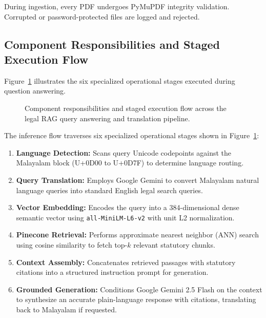 \documentclass[12pt,a4paper]{report}
\begin{document}
During ingestion, every PDF undergoes PyMuPDF integrity validation. Corrupted or password-protected files are logged and rejected.

\subsection{Component Responsibilities and Staged Execution Flow}
Figure~\ref{fig:ml_inference_flow} illustrates the six specialized operational stages executed during question answering.

\begin{figure}[H]
    \centering
    \caption{Component responsibilities and staged execution flow across the legal RAG query answering and translation pipeline.}
    \label{fig:ml_inference_flow}
\end{figure}

The inference flow traverses six specialized operational stages shown in Figure~\ref{fig:ml_inference_flow}:
\begin{enumerate}
    \item \textbf{Language Detection:} Scans query Unicode codepoints against the Malayalam block (U+0D00 to U+0D7F) to determine language routing.
    \item \textbf{Query Translation:} Employs Google Gemini to convert Malayalam natural language queries into standard English legal search queries.
    \item \textbf{Vector Embedding:} Encodes the query into a 384-dimensional dense semantic vector using \texttt{all-MiniLM-L6-v2} with unit L2 normalization.
    \item \textbf{Pinecone Retrieval:} Performs approximate nearest neighbor (ANN) search using cosine similarity to fetch top-$k$ relevant statutory chunks.
    \item \textbf{Context Assembly:} Concatenates retrieved passages with statutory citations into a structured instruction prompt for generation.
    \item \textbf{Grounded Generation:} Conditions Google Gemini 2.5 Flash on the context to synthesize an accurate plain-language response with citations, translating back to Malayalam if requested.
\end{enumerate}
\end{document}
